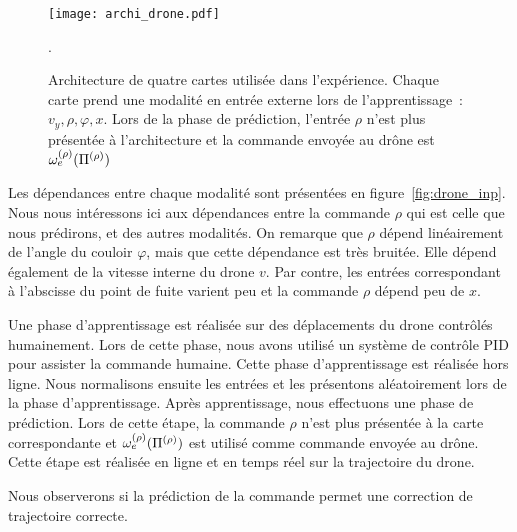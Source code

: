 \documentclass[../main]{subfiles}
\begin{document}
\begin{figure}
	\centering\texttt{[image: archi\_drone.pdf]}
	\caption{Architecture de quatre cartes utilisée dans l'expérience. Chaque carte prend une modalité en entrée externe lors de l'apprentissage~: $v_y,\rho,\varphi,x$. Lors de la phase de prédiction, l'entrée $\rho$ n'est plus présentée à l'architecture et la commande envoyée au drône est $\omega_e^{({\rho})}(\Pi^{({\rho})})$\label{fig:archi_drone}}.
\end{figure}

Les dépendances entre chaque modalité sont présentées en figure~\ref{fig:drone_inp}. Nous nous intéressons ici aux dépendances entre la commande $\rho$ qui est celle que nous prédirons, et des autres modalités.
On remarque que $\rho$ dépend linéairement de l'angle du couloir $\varphi$, mais que cette dépendance est très bruitée. Elle dépend également de la vitesse interne du drone $v$. Par contre, les entrées correspondant à l'abscisse du point de fuite varient peu et la commande $\rho$ dépend peu de $x$.

Une phase d'apprentissage est réalisée sur des déplacements du drone contrôlés humainement. Lors de cette phase, nous avons utilisé un système de contrôle PID pour assister la commande humaine. 
Cette phase d'apprentissage est réalisée hors ligne. Nous normalisons ensuite les entrées et les présentons aléatoirement lors de la phase d'apprentissage.
Après apprentissage, nous effectuons une phase de prédiction. Lors de cette étape, la commande $\rho$ n'est plus présentée à la carte correspondante et $\omega_e^{({\rho})}(\Pi^{({\rho})})$ est utilisé comme commande envoyée au drône.
Cette étape est réalisée en ligne et en temps réel sur la trajectoire du drone.

Nous observerons si la prédiction de la commande permet une correction de trajectoire correcte.

\end{document}
